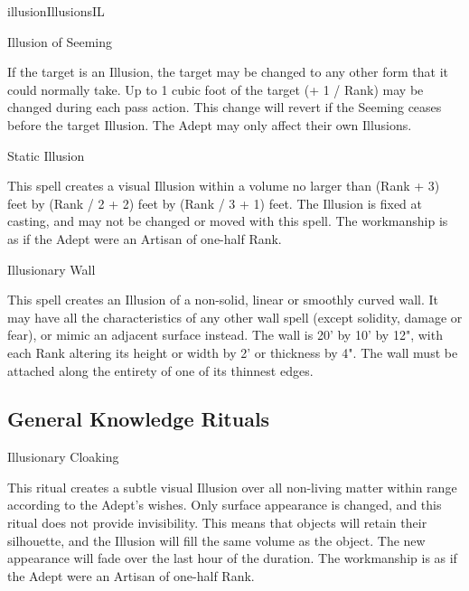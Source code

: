 \begin{college}[1.4]{illusion}{Illusions}{IL}
\begin{spell}[G-6]{Illusion of Seeming}
\begin{effects}
If the target is an Illusion, the target may be changed to any other
form that it could normally take. Up to 1 cubic foot of the target (+
1 / Rank) may be changed during each pass action. This change will
revert if the Seeming ceases before the target Illusion. The Adept may
only affect their own Illusions.
\end{effects}
\end{spell}

\begin{spell}[G-7]{Static Illusion}

\begin{effects}
This spell creates a visual Illusion within a volume no larger than
(Rank + 3) feet by (Rank / 2 + 2) feet by (Rank / 3 + 1) feet. The
Illusion is fixed at casting, and may not be changed or moved with
this spell. The workmanship is as if the Adept were an Artisan of
one-half Rank.
\end{effects}
\end{spell}

\begin{spell}[G-8]{Illusionary Wall}

\begin{effects}
This spell creates an Illusion of a non-solid, linear or smoothly
curved wall. It may have all the characteristics of any other wall
spell (except solidity, damage or fear), or mimic an adjacent surface
instead. The wall is 20' by 10' by 12", with each Rank altering its
height or width by 2' or thickness by 4". The wall must be attached
along the entirety of one of its thinnest edges.
\end{effects}
\end{spell}

\subsection{General Knowledge Rituals}

\begin{ritual}[Q-1]{Illusionary Cloaking}

\begin{effects}
This ritual creates a subtle visual Illusion over all non-living
matter within range according to the Adept's wishes. Only surface
appearance is changed, and this ritual does not provide invisibility.
This means that objects will retain their silhouette, and the Illusion
will fill the same volume as the object. The new appearance will fade
over the last hour of the duration. The workmanship is as if the Adept
were an Artisan of one-half Rank.
\end{effects}
\end{ritual}


\end{college}

